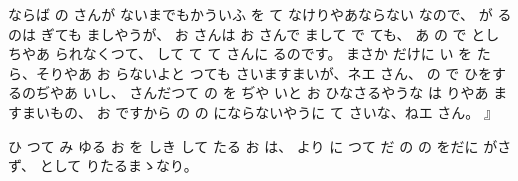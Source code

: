 ならば
の
さんが
ないまでもかういふ
を
て
なけりやあならない
なので、
が
るのは
ぎても
ましやうが、
お
さんは
お
さんで
まして
で
ても、
あ
の
で
としちやあ
られなくつて、
して
て
て
さんに
るのです。
まさか
だけに
い
を
たら、そりやあ
お
らないよと
つても
さいますまいが、ネエ
さん、
の
で
ひをするのぢやあ
いし、
さんだつて
の
を
ぢや
いと
お
ひなさるやうな
は
りやあ
ますまいもの、
お
ですから
の
の
にならないやうに
て
さいな、ねエ
さん。
』

ひ
つて
み
ゆる
お
を
しき
して
たる
お
は、
より
に
つて
だ
の
の
をだに
がさず、
として
りたるまゝなり。
